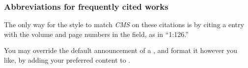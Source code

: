 \documentclass[11pt,letterpaper,oneside]{article}
\begin{document}
\begin{citeonly}
\item \cite[3]{morrison2004a}
\item \cite[18]{morrison2004a}
\item \cite[18]{morrison2004a}
\item \cite[24--26]{morrison2004a}
\item \cite[401-2]{morrison2004b}
\item \cite[433]{morrison2004b}
\item \cite[37--38]{diaz2008}
\item \cite[403]{morrison2004b}
\item \cite[152]{diaz2008}
\item \cite[201-2]{diaz2008}
\item \cites[240]{morrison2004b}[32]{morrison2004a}
\item \cite[33]{morrison2004a}
\end{citeonly}

\setcounter{subsubsection}{58}
\subsubsection{Abbreviations for frequently cited works}
\label{14.59}

The only way for the style to match \textit{CMS} on these citations is
by citing a  entry with the volume and page
numbers in the  field, as in ``1:126.''

You may override the default announcement of a ,
and format it however you like, by adding your preferred content to
.

\begin{citebib}
\item \cite[1:126]{shurtleff1853}
\item \cite[2:330]{shurtleff1853}
\end{citebib}
\end{document}
